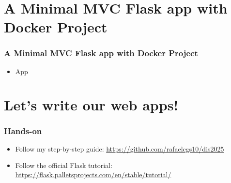 \documentclass[fleqn,aspectratio=169,10pt]{beamer}
\begin{document}
\section{A Minimal MVC Flask app with Docker Project}
\begin{frame}
  \frametitle{A Minimal MVC Flask app with Docker Project}
  \begin{itemize}
    \item App
  \end{itemize}
\end{frame}

\section{Let's write our web apps!}
\begin{frame}
  \frametitle{Hands-on}
  \begin{itemize}
    \item Follow my step-by-step guide: \url{https://github.com/rafaelcgs10/dis2025}
    \item Follow the official Flask tutorial: \url{https://flask.palletsprojects.com/en/stable/tutorial/}
  \end{itemize}
\end{frame}
\end{document}
